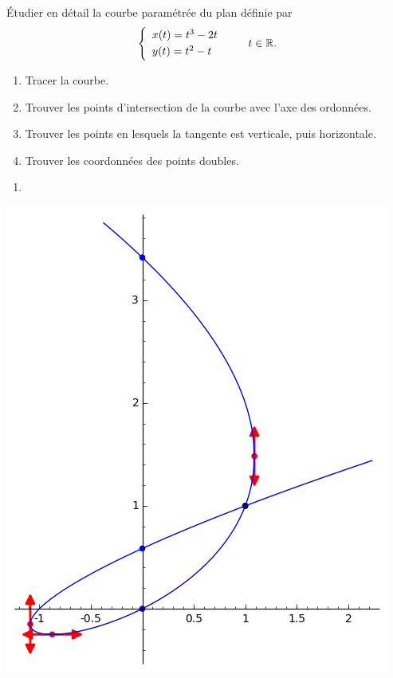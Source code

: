\begin{frame}
\begin{tp}
\'Etudier en détail la courbe paramétrée du plan définie par 
  $$\left\{
  \begin{array}{l}
  x(t) =  t^3-2t\\[1mm]
  y(t) =  t^2-t
  \end{array}
  \right.\qquad  t \in \mathbb{R}.$$
\begin{enumerate}
  \item Tracer la courbe.
  
  \item Trouver les points d'intersection de la courbe avec l'axe des ordonnées.
  
  \item Trouver les points en lesquels la tangente est verticale, puis horizontale.
  
  \item Trouver les coordonnées des points doubles.
\end{enumerate}
\end{tp}
\end{frame}


\begin{frame}
\begin{enumerate} 
  \item ~
\end{enumerate}
\vspace*{-2ex}
\begin{center}
  \includegraphics[scale=0.52]{figures/courbe.png} 
\end{center}

\end{frame}


